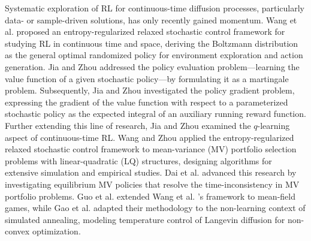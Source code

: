 \documentclass[onecolumn, journal]{IEEEtran} %
\begin{document}
	Systematic exploration of RL for continuous-time diffusion processes, particularly data- or sample-driven solutions, has only recently gained momentum. Wang et al. \cite{wang2020reinforcement} proposed an entropy-regularized relaxed stochastic control framework for studying RL in continuous time and space, deriving the Boltzmann distribution as the general optimal randomized policy for environment exploration and action generation. Jia and Zhou \cite{jia2022policya} addressed the policy evaluation problem---learning the value function of a given stochastic policy---by formulating it as a martingale problem. Subsequently, Jia and Zhou \cite{jia2022policyb} investigated the policy gradient problem, expressing the gradient of the value function with respect to a parameterized stochastic policy as the expected integral of an auxiliary running reward function. Further extending this line of research, Jia and Zhou \cite{jia2023q} examined the $q$-learning aspect of continuous-time RL. Wang and Zhou \cite{wang2020continuous} applied the entropy-regularized relaxed stochastic control framework to mean-variance (MV) portfolio selection problems with linear-quadratic (LQ) structures, designing algorithms for extensive simulation and empirical studies. Dai et al. \cite{dai2023learning} advanced this research by investigating equilibrium MV policies that resolve the time-inconsistency in MV portfolio problems. Guo et al. \cite{guo2022entropy} extended Wang et al. \cite{wang2020reinforcement}'s framework to mean-field games, while Gao et al. \cite{gao2022state} adapted their methodology to the non-learning context of simulated annealing, modeling temperature control of Langevin diffusion for non-convex optimization.
	
\end{document}
